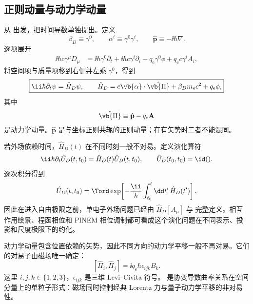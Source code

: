 \subsection{正则动量与动力学动量}\label{sec:feqo-minimal-coupling}

从  出发，把时间导数单独提出。定义
\begin{equation*}
 \beta_D\equiv\gamma^0,
 \qquad
 \alpha^i\equiv\gamma^0\gamma^i,
 \qquad
 \hat{\mathbf p}\equiv-\ii\hbar\nabla.
\end{equation*}
逐项展开
\begin{align*}
 \ii\hbar c\gamma^\mu D_\mu
 &=\ii\hbar\gamma^0\partial_t
 +\ii\hbar c\gamma^i\partial_i
 -q_{\mathrm e}\gamma^0\phi
 +q_{\mathrm e} c\gamma^i A_i,
\end{align*}
将空间项与质量项移到右侧并左乘 $\gamma^0$，得到
\begin{equation}
 \boxed{
 \ii\hbar\partial_t\psi
 =\hat H_D\psi,
 \qquad
 \hat H_D
 =c\vb{\alpha}\cdot\hat{\vb{\Pi}}
 +\beta_D m_{\mathrm e} c^2+q_{\mathrm e}\phi,
 }
 \label{eq:dirac-hamiltonian-em}\end{equation}
其中
\begin{equation}
 \hat{\vb{\Pi}}\equiv\hat{\mathbf p}-q_{\mathrm e}\mathbf A
 \label{eq:kinetic-momentum}
\end{equation}
是动力学动量。$\hat{\mathbf p}$ 是与坐标正则共轭的正则动量；在有矢势时二者不能混同。

若外场依赖时间，$\hat H_D(t)$ 在不同时刻一般不对易。定义演化算符
\begin{equation*}
 \ii\hbar\partial_t\hat U_D(t,t_0)=\hat H_D(t)\hat U_D(t,t_0),
 \qquad \hat U_D(t_0,t_0)=\id().
\end{equation*}
逐次积分得到
\begin{equation}
 \hat U_D(t,t_0)=
 \Tord\exp\!\left[-\frac{\ii}{\hbar}
 \int_{t_0}^{t}\dd t'\,\hat H_D(t')\right].
 \label{eq:dirac-time-evolution}
\end{equation}
因此在进入自由极限之前，单电子外场问题已经由 $\hat H_D[A_\mu]$ 与  完整定义。相互作用绘景、程函相位和 PINEM 相位调制都可看成这个演化问题在不同表示、投影和尺度极限下的约化。



动力学动量包含位置依赖的矢势，因此不同方向的动力学平移一般不再对易。它们的对易子由磁场唯一确定：
\begin{equation}
 \boxed{
 [\hat\Pi_i,\hat\Pi_j]
 =\ii q_{\mathrm e}\hbar\epsilon_{ijk}B_k.}
 \label{eq:pi-commutator}
\end{equation}
这里 $i,j,k\in\{1,2,3\}$，$\epsilon_{ijk}$ 是三维 Levi--Civita 符号。 是协变导数曲率关系在空间分量上的单粒子形式：磁场同时控制经典 Lorentz 力与量子动力学平移的非对易性。

